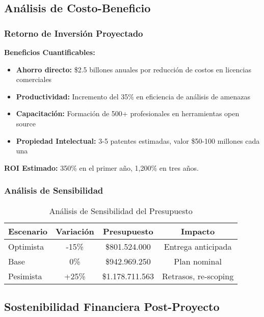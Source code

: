 \subsection{Análisis de Costo-Beneficio}

\subsubsection{Retorno de Inversión Proyectado}

\textbf{Beneficios Cuantificables:}
\begin{itemize}
    \item \textbf{Ahorro directo:} \$2.5 billones anuales por reducción de costos en licencias comerciales
    \item \textbf{Productividad:} Incremento del 35\% en eficiencia de análisis de amenazas
    \item \textbf{Capacitación:} Formación de 500+ profesionales en herramientas open source
    \item \textbf{Propiedad Intelectual:} 3-5 patentes estimadas, valor \$50-100 millones cada una
\end{itemize}

\textbf{ROI Estimado:} 350\% en el primer año, 1,200\% en tres años.

\subsubsection{Análisis de Sensibilidad}

\begin{table}[H]
    \centering
    \caption{Análisis de Sensibilidad del Presupuesto}
    \small
    \begin{tabular}{|l|c|c|c|}
        \hline
        \textbf{Escenario} & \textbf{Variación} & \textbf{Presupuesto} & \textbf{Impacto} \\
        \hline
        Optimista & -15\% & \$801.524.000 & Entrega anticipada \\
        \hline
        Base & 0\% & \$942.969.250 & Plan nominal \\
        \hline
        Pesimista & +25\% & \$1.178.711.563 & Retrasos, re-scoping \\
        \hline
    \end{tabular}
\end{table}

\subsection{Sostenibilidad Financiera Post-Proyecto}

